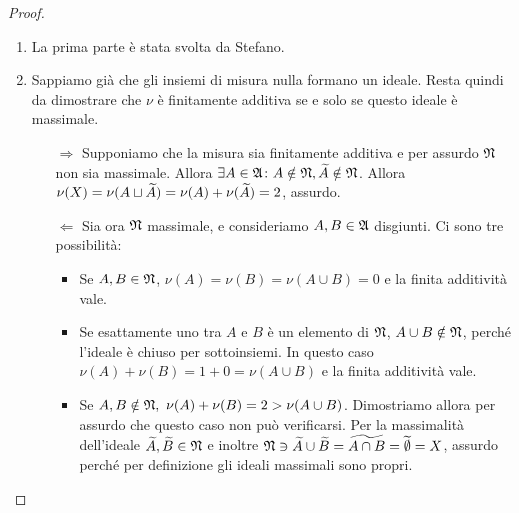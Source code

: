 \documentclass[../EserciziIstituzioniAnalisi.tex]{subfiles}
\begin{document}
\begin{proof}
  \begin{enumerate}
    \item La prima parte è stata svolta da Stefano.
    \item Sappiamo già che gli insiemi di misura nulla formano un ideale. Resta quindi da dimostrare che $\nu$ è finitamente additiva se e solo se questo ideale è massimale.
    \begin{itemize}
      \item[$\Rightarrow$] Supponiamo che la misura sia finitamente additiva e per assurdo $\mathfrak N$ non sia massimale. Allora $\exists A\in\mathfrak A \colon A\notin \mathfrak N, \widetilde{A}\notin\mathfrak N$. Allora $\nu(X)=\nu(A\sqcup \widetilde{A})=\nu(A)+\nu (\widetilde{A})=2$, assurdo.
      \item[$\Leftarrow$] Sia ora $\mathfrak N$ massimale, e consideriamo $A,B\in\mathfrak A$ disgiunti. Ci sono tre possibilità:
      \begin{itemize}
        \item Se $A,B\in\mathfrak N$, $\nu(A)=\nu(B)=\nu(A \cup B)=0$ e la finita additività vale.
        \item Se esattamente uno tra $A$ e $B$ è un elemento di $\mathfrak N$, $A\cup B \notin \mathfrak N$, perché l'ideale è chiuso per sottoinsiemi. In questo caso $\nu(A)+\nu(B)=1+0=\nu(A \cup B)$ e la finita additività vale.
        \item Se $A,B\notin\gN,\ \nu(A)+\nu(B)=2>\nu(A \cup B)$. Dimostriamo allora per assurdo che questo caso non può verificarsi. Per la massimalità dell'ideale $\widetilde{A},\widetilde{B}\in\mathfrak N$ e  inoltre $\mathfrak N \ni \widetilde{A} \cup \widetilde{B}=\widetilde{A\cap B}=\widetilde{\emptyset}=X$, assurdo perché per definizione gli ideali massimali sono propri.
      \end{itemize}
    \end{itemize}
  \end{enumerate}
\end{proof}
\end{document}
